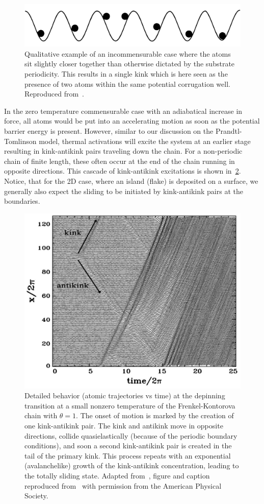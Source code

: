 \begin{figure}[!htb]
  \centering
  \includegraphics[width=0.55\linewidth]{figures/theory/incommensurable_example.png}
  \caption{Qualitative example of an incommensurable case where the atoms sit slightly closer together than otherwise dictated by the substrate periodicity. This results in a single kink which is here seen as the presence of two atoms within the same potential corrugation well. Reproduced from~\cite{BRAUN19981}.}
  \label{fig:incommensurable_example}
\end{figure}


In the zero temperature commensurable case with an adiabatical increase in force, all atoms would be put into an accelerating motion as soon as the potential barrier energy is present. However, similar to our discussion on the Prandtl-Tomlinson model, thermal activations will excite the system at an earlier stage resulting in kink-antikink pairs traveling down the chain. For a non-periodic chain of finite length, these often occur at the end of the chain running in opposite directions. This cascade of kink-antikink excitations is shown in~\cref{fig:kink_antikink}. Notice, that for the 2D case, where an island (flake) is deposited on a surface, we generally also expect the sliding to be initiated by kink-antikink pairs at the boundaries. 


\begin{figure}[!htb]
  \centering
  \includegraphics[width=0.45\linewidth]{figures/theory/kink_antikink.png}
  \caption{Detailed behavior (atomic trajectories vs time) at the depinning transition at a small nonzero temperature of the Frenkel-Kontorova chain with $\theta = 1$. The onset of motion is marked by the creation of one kink-antikink pair. The kink and antikink move in opposite directions, collide quasielastically (because of the periodic boundary conditions), and soon a second kink-antikink pair is created in the tail of the primary kink. This process repeats with an exponential (avalanchelike) growth of the kink-antikink concentration, leading to the totally sliding state. Adapted from~\cite{PhysRevLett.79.3692}, figure and caption reproduced from~\cite{Vanossi_2013} with permission from the American Physical Society.}
  \label{fig:kink_antikink}
\end{figure}


